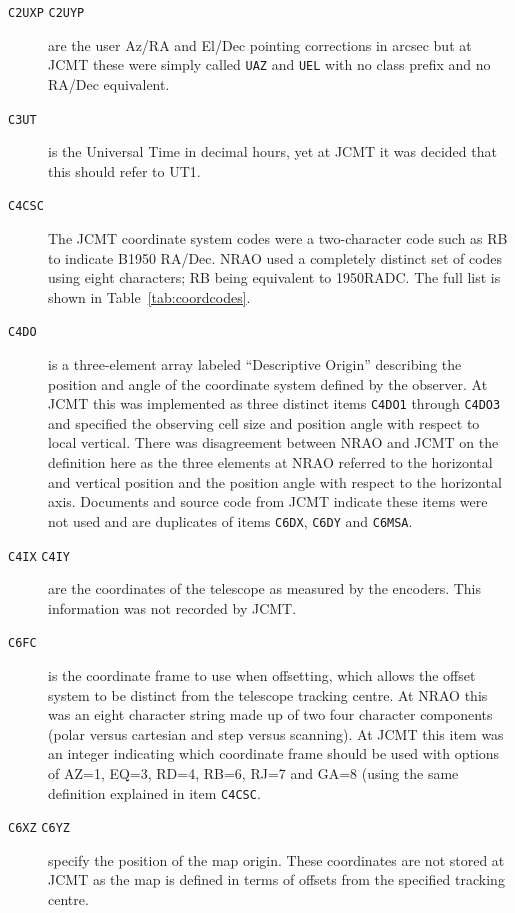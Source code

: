 \documentclass[final,authoryear,5p,times,twocolumn]{elsarticle}
\begin{document}
\begin{description}
\item[\texttt{C2UXP} \texttt{C2UYP}] are the user Az/RA and El/Dec
  pointing corrections in arcsec but at JCMT these were simply called
  \texttt{UAZ} and \texttt{UEL} with no class prefix and no RA/Dec
  equivalent.

\item[\texttt{C3UT}] is the Universal Time in decimal hours, yet at
  JCMT it was decided that this should refer to UT1.

\item[\texttt{C4CSC}] The JCMT coordinate system codes \citep{mtdn12}
  were a two-character code such as RB to indicate B1950 RA/Dec.
  NRAO used a completely distinct set of codes using eight
  characters; RB being equivalent to 1950RADC. The full list is shown
  in Table~\ref{tab:coordcodes}.

\item[\texttt{C4DO}] is a three-element array labeled ``Descriptive
  Origin'' describing the position and angle of the coordinate system
  defined by the observer. At JCMT this was implemented as three
  distinct items \texttt{C4DO1} through \texttt{C4DO3} and specified
  the observing cell size and position angle with respect to local
  vertical. There was disagreement between NRAO and JCMT on the
  definition here as the three elements at NRAO referred to the
  horizontal and vertical position and the position angle with respect
  to the horizontal axis. Documents and source code from JCMT indicate
  these items were not used and are duplicates of items \texttt{C6DX},
  \texttt{C6DY} and \texttt{C6MSA}.

\item[\texttt{C4IX} \texttt{C4IY}] are the coordinates of the
  telescope as measured by the encoders. This information was not
  recorded by JCMT.

\item[\texttt{C6FC}] is the coordinate frame to use when offsetting,
  which allows the offset system to be distinct from the telescope
  tracking centre. At NRAO this was an eight character string made up
  of two four character components (polar versus cartesian and step
  versus scanning). At JCMT this item was an integer indicating which
  coordinate frame should be used with options of AZ=1, EQ=3, RD=4,
  RB=6, RJ=7 and GA=8 (using the same definition explained in item
  \texttt{C4CSC}.

\item[\texttt{C6XZ} \texttt{C6YZ}] specify the position of the map
  origin. These coordinates are not stored at JCMT as the map is
  defined in terms of offsets from the specified tracking centre.


\end{description}
\end{document}

